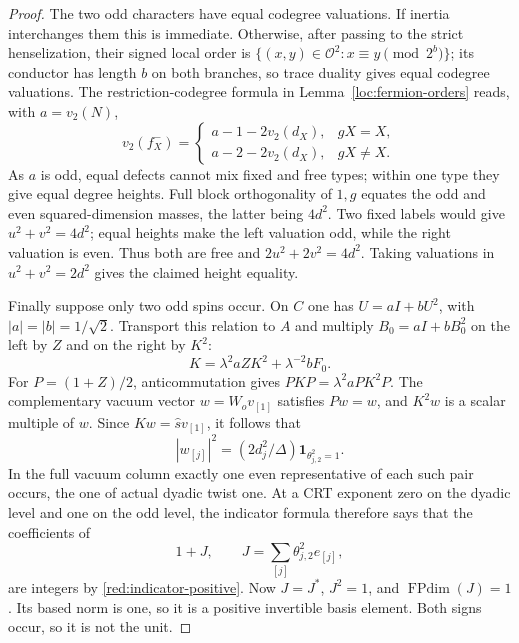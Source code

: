 \documentclass[11pt,a4paper]{article}
\numberwithin{equation}{section}
\begin{document}
\begin{proof}
The two odd characters have equal codegree valuations. If inertia
interchanges them this is immediate. Otherwise, after passing to the strict henselization, their signed
local order is $\{(x,y)\in\mathcal O^2:x\equiv y\pmod{2^b}\}$;
its conductor has length $b$ on both branches, so trace duality
gives equal codegree valuations. The restriction-codegree formula
in Lemma~\ref{loc:fermion-orders} reads, with $a=v_2(N)$,
\[
 v_2(f_X^-)=
 \begin{cases}a-1-2v_2(d_X),&gX=X,\\
               a-2-2v_2(d_X),&gX\ne X.
 \end{cases}
\]
As $a$ is odd, equal defects cannot mix fixed and free types; within
one type they give equal degree heights. Full block orthogonality of
$1,g$ equates the odd and even squared-dimension masses, the latter
being $4d^2$. Two fixed labels would give $u^2+v^2=4d^2$;
equal heights make the left valuation odd, while the right valuation
is even. Thus both are free and $2u^2+2v^2=4d^2$.
Taking valuations in $u^2+v^2=2d^2$ gives the claimed height equality.

Finally suppose only two odd spins occur. On $C$ one has
$U=aI+bU^2$, with $|a|=|b|=1/\sqrt2$. Transport this relation to $A$ and multiply
$B_0=aI+bB_0^2$ on the left by $Z$ and on the right by $K^2$:
\[
 K=\lambda^{2}a ZK^2+\lambda^{-2} b F_0 .
\]
For $P=(1+Z)/2$, anticommutation gives
$PKP=\lambda^2a PK^2P$. The complementary vacuum vector
$w=W_ov_{[1]}$ satisfies $Pw=w$, and $K^2w$ is a scalar multiple
of $w$. Since $Kw=\widehat s v_{[1]}$, it follows that
\[
 |w_{[j]}|^2=(2d_j^2/\Delta)\mathbf1_{\theta_{j,2}^2=1}.
\]
In the full vacuum column exactly one even representative of each
such pair occurs, the one of actual dyadic twist one. At a CRT
exponent zero on the dyadic level and one on the odd level, the
indicator formula therefore says that the coefficients of
\[
               1+J,\qquad J=\sum_{[j]}\theta_{j,2}^2e_{[j]},
\]
are integers by \eqref{red:indicator-positive}. Now $J=J^*$, $J^2=1$, and
$\operatorname{FPdim}(J)=1$. Its based norm is one, so it is a
positive invertible basis element. Both signs occur, so it is
not the unit.
\end{proof}
\end{document}

